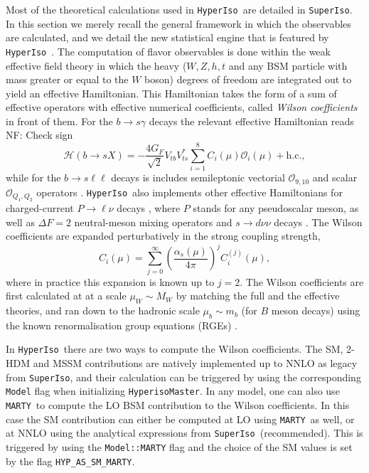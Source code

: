 \documentclass[preprint,11pt]{elsarticle}
\newcommand{\hi}{\texttt{HyperIso}}
\newcommand{\spi}{\texttt{SuperIso}}
\newcommand{\mty}{\texttt{MARTY}}
\newcommand{\NF}[1]{{\textcolor{myg}{NF: #1}}}
\begin{document}
Most of the theoretical calculations used in \hi~are detailed in \spi. In this section we merely recall the general framework in which the observables are calculated, and we detail the new statistical engine that is featured by \hi~.\smallbreak
The computation of flavor observables is done within the weak effective field theory in which the heavy ($W,Z,h,t$ and any BSM particle with mass greater or equal to the $W$ boson) degrees of freedom are integrated out to yield an effective Hamiltonian. This Hamiltonian takes the form of a sum of effective operators with effective numerical coefficients, called \textit{Wilson coefficients} in front of them. For the $b\to s\gamma$ decays the relevant effective Hamiltonian reads \cite{Chetyrkin:1997gb}
\NF{Check sign}
\begin{equation}
    \mathcal{H}(b\to sX) = -\frac{4 G_F}{\sqrt{2}} V_{tb}V_{ts}^*\sum_{i=1}^{8} C_i(\mu)\mathcal{O}_i(\mu)+\mathrm{h.c.},
\end{equation}
while for the $b\to s\ell\ell$ decays is includes semileptonic vectorial $\mathcal{O}_{9,10}$ and scalar $\mathcal{O}_{Q_1,Q_2}$ operators \cite{Yan:2000dc}. \hi~also implements other effective Hamiltonians for charged-current $P\to\ell\nu$ decays \cite{Sakaki:2013bfa}, where $P$ stands for any pseudoscalar meson, as well as $\Delta F=2$ neutral-meson mixing operators \cite{Aebischer:2020dsw} and $s\to d\nu\nu$ decays \cite{Brod:2010hi}. \smallbreak
The Wilson coefficients are expanded perturbatively in the strong coupling strength,
\begin{equation}
    C_i(\mu) = \sum_{j=0}^\infty \left(\frac{\alpha_s(\mu)}{4\pi}\right)^j C_{i}^{(j)}(\mu),
\end{equation}
where in practice this expansion is known up to $j=2$.
The Wilson coefficients are first calculated at at a scale $\mu_W\sim M_W$ by matching the full and the effective theories, and ran down to the hadronic scale $\mu_b\sim m_b$ (for $B$ meson decays) using the known renormalisation group equations (RGEs) \cite{Aebischer:2020dsw,Czakon:2006ss,Bobeth:2013tba}.

In \hi~there are two ways to compute the Wilson coefficients. The SM, 2-HDM and MSSM contributions are natively implemented up to NNLO as legacy from \spi, and their calculation can be triggered by using the corresponding \texttt{Model} flag when initializing \texttt{HyperisoMaster}. In any model, one can also use \mty~to compute the LO BSM contribution to the Wilson coefficients. In this case the SM contribution can either be computed at LO using \mty~as well, or at NNLO using the analytical expressions from \spi~(recommended). This is triggered by using the \texttt{Model::MARTY} flag and the choice of the SM values is set by the flag \texttt{HYP\_AS\_SM\_MARTY}.
\end{document}
